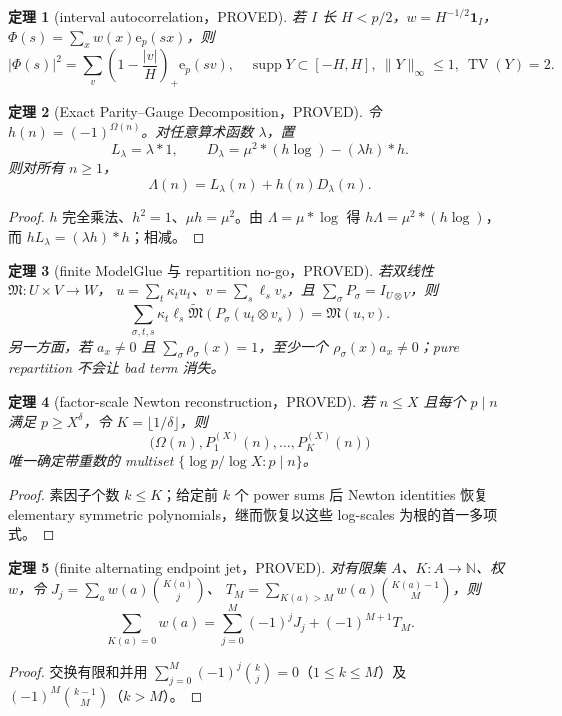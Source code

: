 \documentclass[11pt,a4paper]{ctexart}
\newtheorem{theorem}{定理}[section]
\theoremstyle{definition}
\newcommand{\e}{\mathrm e}
\newcommand{\1}{\mathbf 1}
\newcommand{\supp}{\operatorname{supp}}
\newcommand{\PROVED}{\textcolor{green!40!black}{\textsf{PROVED}}}
\begin{document}
\begin{theorem}[interval autocorrelation，\PROVED]
若 $I$ 长 $H<p/2$，$w=H^{-1/2}\1_I$，
$\Phi(s)=\sum_xw(x)\e_p(sx)$，则
\[
 |\Phi(s)|^2=\sum_v\left(1-\frac{|v|}{H}\right)_+\e_p(sv),\quad
 \supp Y\subset[-H,H],\ \|Y\|_\infty\le1,\ \operatorname{TV}(Y)=2.\tag{TK.10}
\]
\end{theorem}

\begin{theorem}[Exact Parity--Gauge Decomposition，\PROVED]
令 $h(n)=(-1)^{\Omega(n)}$。对任意算术函数 $\lambda$，置
\[
 L_\lambda=\lambda*1,\qquad
 D_\lambda=\mu^2*(h\log)-(\lambda h)*h.
\]
则对所有 $n\ge1$，
\[
 \boxed{\Lambda(n)=L_\lambda(n)+h(n)D_\lambda(n).}  \tag{TK.11}
\]
\end{theorem}
\begin{proof}
$h$ 完全乘法、$h^2=1$、$\mu h=\mu^2$。由 $\Lambda=\mu*\log$ 得
$h\Lambda=\mu^2*(h\log)$，而 $hL_\lambda=(\lambda h)*h$；相减。
\end{proof}

\begin{theorem}[finite ModelGlue 与 repartition no-go，\PROVED]
若双线性 $\mathfrak M:U\times V\to W$，
$u=\sum_t\kappa_tu_t$、$v=\sum_s\ell_sv_s$，且
$\sum_\sigma P_\sigma=I_{U\otimes V}$，则
\[
 \sum_{\sigma,t,s}\kappa_t\ell_s
 \widetilde{\mathfrak M}(P_\sigma(u_t\otimes v_s))=\mathfrak M(u,v).\tag{TK.12}
\]
另一方面，若 $a_x\ne0$ 且 $\sum_\sigma\rho_\sigma(x)=1$，至少一个
$\rho_\sigma(x)a_x\ne0$；pure repartition 不会让 bad term 消失。
\end{theorem}

\begin{theorem}[factor-scale Newton reconstruction，\PROVED]
若 $n\le X$ 且每个 $p\mid n$ 满足 $p\ge X^\delta$，令
$K=\lfloor1/\delta\rfloor$，则
\[
 \bigl(\Omega(n),P_1^{(X)}(n),\ldots,P_K^{(X)}(n)\bigr)\tag{TK.13}
\]
唯一确定带重数的 multiset $\{\log p/\log X:p\mid n\}$。
\end{theorem}
\begin{proof}
素因子个数 $k\le K$；给定前 $k$ 个 power sums 后 Newton identities 恢复
elementary symmetric polynomials，继而恢复以这些 log-scales 为根的首一多项式。
\end{proof}

\begin{theorem}[finite alternating endpoint jet，\PROVED]
对有限集 $A$、$K:A\to\mathbb N$、权 $w$，令
$J_j=\sum_aw(a)\binom{K(a)}j$、
$T_M=\sum_{K(a)>M}w(a)\binom{K(a)-1}M$，则
\[
 \sum_{K(a)=0}w(a)=\sum_{j=0}^M(-1)^jJ_j+(-1)^{M+1}T_M.\tag{TK.14}
\]
\end{theorem}
\begin{proof}
交换有限和并用
$\sum_{j=0}^M(-1)^j\binom kj=0$（$1\le k\le M$）及
$(-1)^M\binom{k-1}M$（$k>M$）。
\end{proof}
\end{document}

